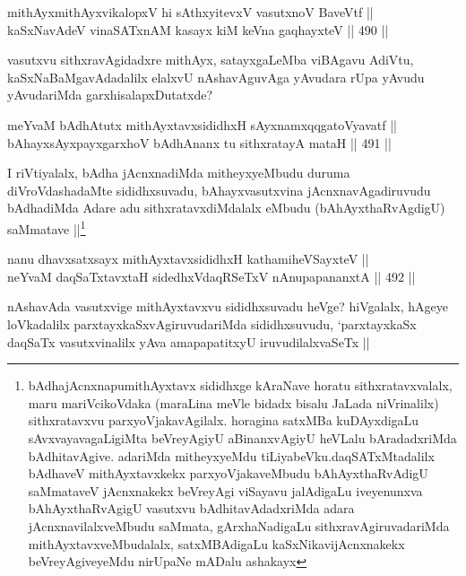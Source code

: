 \begin{shl}
mithAyxmithAyxvikalopxV hi sAthxyitevxV vasutxnoV BaveVtf || \\
kaSxNavAdeV vinaSATxnAM kasayx kiM keVna gaqhayxteV ||  490 ||  
\end{shl}

\begin{artha}
vasutxvu sithxravAgidadxre mithAyx, satayxgaLeMba viBAgavu AdiVtu, kaSxNaBaMgavAdadalilx elalxvU nAshavAguvAga yAvudara rUpa yAvudu yAvudariMda garxhisalapxDutatxde?
\end{artha}


\begin{shl}
meYvaM bAdhAtutx mithAyxtavxsididhxH sAyxnamxqqgatoVyavatf ||  \\
bAhayxsAyxpayxgarxhoV bAdhAnanx tu sithxratayA mataH ||  491 || 
\end{shl}

\begin{artha}
I riVtiyalalx, bAdha jAcnxnadiMda mitheyxyeMbudu duruma diVroVdashadaMte sididhxsuvadu, bAhayxvasutxvina jAcnxnavAgadiruvudu bAdhadiMda Adare adu sithxratavxdiMdalalx eMbudu (bAhAyxthaRvAgdigU) saMmatave ||\footnote{bAdhajAcnxnapumithAyxtavx sididhxge kAraNave horatu sithxratavxvalalx, maru mariVcikoVdaka (maraLina meVle bidadx bisalu JaLada niVrinalilx) sithxratavxvu parxyoVjakavAgilalx. horagina satxMBa kuDAyxdigaLu sAvxvayavagaLigiMta beVreyAgiyU aBinanxvAgiyU heVLalu bAradadxriMda bAdhitavAgive. adariMda mitheyxyeMdu tiLiyabeVku.daqSATxMtadalilx bAdhaveV mithAyxtavxkekx parxyoVjakaveMbudu bAhAyxthaRvAdigU saMmataveV jAcnxnakekx beVreyAgi viSayavu jalAdigaLu iveyenunxva bAhAyxthaRvAgigU vasutxvu bAdhitavAdadxriMda adara jAcnxnavilalxveMbudu saMmata, gArxhaNadigaLu sithxravAgiruvadariMda mithAyxtavxveMbudalalx, satxMBAdigaLu kaSxNikavijAcnxnakekx beVreyAgiveyeMdu nirUpaNe mADalu ashakayx} 
\end{artha}

\begin{shl}
nanu dhavxsatxsayx mithAyxtavxsididhxH kathamiheVSayxteV || \\
neYvaM daqSaTxtavxtaH sidedhxVdaqRSeTxV nAnupapananxtA ||  492 ||  
\end{shl}

\begin{artha}
nAshavAda vasutxvige mithAyxtavxvu sididhxsuvadu heVge? hiVgalalx, hAgeye loVkadalilx parxtayxkaSxvAgiruvudariMda sididhxsuvudu, `parxtayxkaSx daqSaTx vasutxvinalilx yAva amapapatitxyU iruvudilalxvaSeTx ||
\end{artha}

